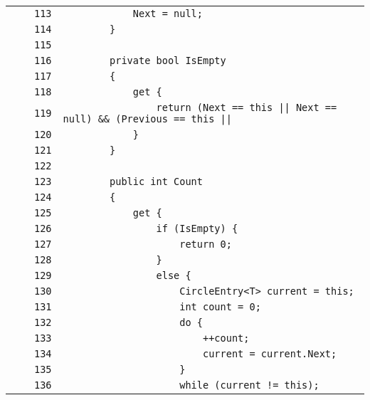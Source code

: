 \documentclass[a4paper,10pt]{article}
\begin{document}
\begin{longtable}[l]{lrrl}
\cellcolor{gray} &  & \verb~113~ & \verb~            Next = null;~\\
\cellcolor{gray} &  & \verb~114~ & \verb~        }~\\
\cellcolor{gray} &  & \verb~115~ & \verb~~\\
\cellcolor{gray} &  & \verb~116~ & \verb~        private bool IsEmpty~\\
\cellcolor{gray} &  & \verb~117~ & \verb~        {~\\
\cellcolor{gray} &  & \verb~118~ & \verb~            get {~\\
\cellcolor{gray} &  & \verb~119~ & \verb~                return (Next == this || Next == null) && (Previous == this || ~\\
\cellcolor{gray} &  & \verb~120~ & \verb~            }~\\
\cellcolor{gray} &  & \verb~121~ & \verb~        }~\\
\cellcolor{gray} &  & \verb~122~ & \verb~~\\
\cellcolor{gray} &  & \verb~123~ & \verb~        public int Count~\\
\cellcolor{gray} &  & \verb~124~ & \verb~        {~\\
\cellcolor{gray} &  & \verb~125~ & \verb~            get {~\\
\cellcolor{gray} &  & \verb~126~ & \verb~                if (IsEmpty) {~\\
\cellcolor{gray} &  & \verb~127~ & \verb~                    return 0;~\\
\cellcolor{gray} &  & \verb~128~ & \verb~                }~\\
\cellcolor{gray} &  & \verb~129~ & \verb~                else {~\\
\cellcolor{gray} &  & \verb~130~ & \verb~                    CircleEntry<T> current = this;~\\
\cellcolor{gray} &  & \verb~131~ & \verb~                    int count = 0;~\\
\cellcolor{gray} &  & \verb~132~ & \verb~                    do {~\\
\cellcolor{gray} &  & \verb~133~ & \verb~                        ++count;~\\
\cellcolor{gray} &  & \verb~134~ & \verb~                        current = current.Next;~\\
\cellcolor{gray} &  & \verb~135~ & \verb~                    }~\\
\cellcolor{gray} &  & \verb~136~ & \verb~                    while (current != this);~\\

\end{longtable}
\end{document}
